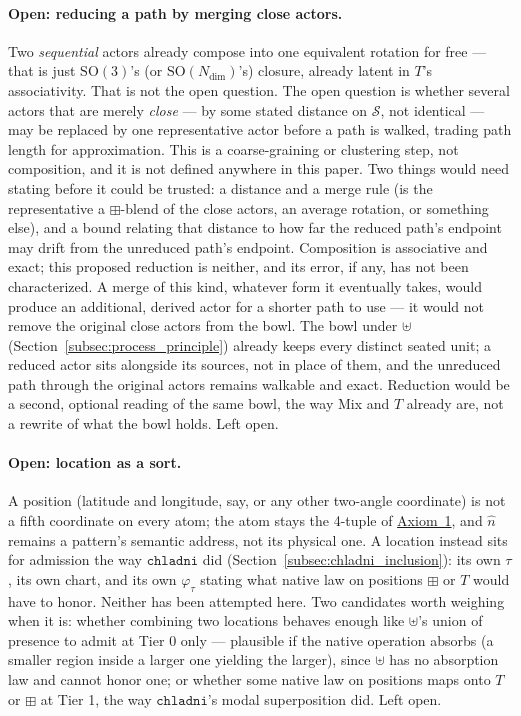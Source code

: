\documentclass[12pt, a4paper]{article}
\begin{document}
\paragraph{Open: reducing a path by merging close actors.} Two
\emph{sequential} actors already compose into one equivalent rotation
for free --- that is just $\mathrm{SO}(3)$'s (or $\mathrm{SO}(N_{\mathrm{dim}})$'s)
closure, already latent in $T$'s associativity. That is not the open
question. The open question is whether several actors that are
merely \emph{close} --- by some stated distance on $\mathcal{S}$, not
identical --- may be replaced by one representative actor before a
path is walked, trading path length for approximation. This is a
coarse-graining or clustering step, not composition, and it is not
defined anywhere in this paper. Two things would need stating before
it could be trusted: a distance and a merge rule (is the
representative a $\boxplus$-blend of the close actors, an average
rotation, or something else), and a bound relating that distance to
how far the reduced path's endpoint may drift from the unreduced
path's endpoint. Composition is associative and exact;
this proposed reduction is neither, and its error, if any, has not
been characterized.
A merge of this kind, whatever form it eventually takes, would
produce an additional, derived actor for a shorter path to use --- it
would not remove the original close actors from the bowl. The bowl
under $\uplus$ (Section~\ref{subsec:process_principle}) already keeps
every distinct seated unit; a reduced actor sits alongside its
sources, not in place of them, and the unreduced path through the
original actors remains walkable and exact. Reduction would be a
second, optional reading of the same bowl, the way Mix and $T$
already are, not a rewrite of what the bowl holds. Left open.

\paragraph{Open: location as a sort.} A position (latitude and
longitude, say, or any other two-angle coordinate) is not a fifth
coordinate on every atom; the atom stays the 4-tuple of
\hyperref[subsec:axiom1]{Axiom~1}, and $\hat n$ remains a pattern's semantic
address, not its physical one. A location instead sits for admission
the way $\mathtt{chladni}$ did
(Section~\ref{subsec:chladni_inclusion}): its own $\tau$, its own
chart, and its own $\varphi_\tau$ stating what native law on positions
$\boxplus$ or $T$ would have to honor. Neither has been attempted
here. Two candidates worth weighing when it is: whether combining two
locations behaves enough like $\uplus$'s union of presence to admit at
Tier 0 only --- plausible if the native operation absorbs (a smaller
region inside a larger one yielding the larger), since $\uplus$ has no
absorption law and cannot honor one; or whether some native law on
positions maps onto $T$ or $\boxplus$ at Tier 1, the way
$\mathtt{chladni}$'s modal superposition did. Left open.
\end{document}

